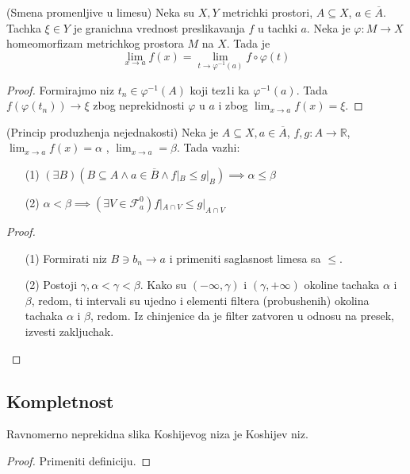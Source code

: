 \documentclass[a4paper,12pt]{article}
\newcommand{\RR}{\mathbb{R}}
\newcommand{\psj}{\subseteq}
\begin{document}
\begin{tvr}
(Smena promenljive u limesu) Neka su $X, Y$ metrichki prostori, $A \psj X$, $a \in \overline{A}$. Tachka $\xi \in Y$ je granichna vrednost preslikavanja $f$ u tachki $a$. Neka je $\varphi: M \to X$ homeomorfizam metrichkog prostora $M$ na $X$. Tada je 
\[\lim_{x \to a} f(x) = \lim_{t \to {\varphi}^{-1}(a)} f \circ \varphi(t)\]
\end{tvr}
\begin{proof}
Formirajmo niz $t_n \in \varphi^{-1} (A)$ koji tez1i ka $\varphi^{-1}(a)$. Tada $f(\varphi(t_n)) \to \xi$ zbog nepre\-kidnosti $\varphi$ u $a$ i zbog $\lim_{x \to a} f(x) = \xi$.
\end{proof}

\begin{tvr}(Princip produzhenja nejednakosti)
	Neka je $A\psj X, a\in \overline A$, $f,g:A\to \RR$, \( \lim_{x\to a}f(x) = \alpha \) , \( \lim_{x\to a} = \beta \). Tada vazhi:
	\begin{enumerate}
		\item[(1)] $(\exists B)(B\psj A \land a \in \overline B \land f|_B \leq g|_B) \implies \alpha \leq \beta$
		\item[(2)] $\alpha < \beta \implies (\exists V \in \mathcal F _a^{0})f|_{A \cap V} \leq g|_{A\cap V}$
	\end{enumerate}
\end{tvr}
\begin{proof}
	\begin{enumerate}
		\item[(1)] Formirati niz $B \ni b_n \to a$ i primeniti saglasnost limesa sa $\leq$.
		\item[(2)] Postoji $\gamma, \alpha < \gamma < \beta$. Kako su $(-\infty, \gamma)$ i $(\gamma, +\infty)$ okoline tachaka $\alpha$ i $\beta$, redom,
			ti intervali su ujedno i elementi filtera (probushenih) okolina tachaka $\alpha$ i $\beta$, redom. Iz chinjenice da je filter zatvoren u odnosu
			na presek, izvesti zakljuchak.
	\end{enumerate}

\end{proof}

\subsection{Kompletnost}

\begin{tvr}
	Ravnomerno neprekidna slika Koshijevog niza je Koshijev niz.
\end{tvr}
\begin{proof}
	Primeniti definiciju.
\end{proof}
\end{document}
